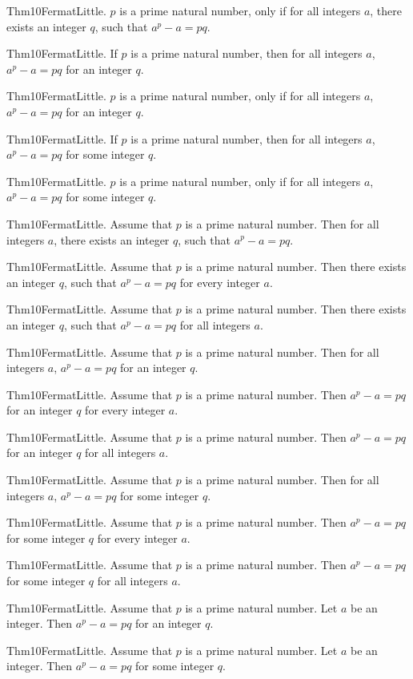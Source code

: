 \documentclass{article}
\begin{document}
Thm10FermatLittle. $p$ is a prime natural number, only if for all integers $a$, there exists an integer $q$, such that $a ^ {p}- a = p q$.

Thm10FermatLittle. If $p$ is a prime natural number, then for all integers $a$, $a ^ {p}- a = p q$ for an integer $q$.

Thm10FermatLittle. $p$ is a prime natural number, only if for all integers $a$, $a ^ {p}- a = p q$ for an integer $q$.

Thm10FermatLittle. If $p$ is a prime natural number, then for all integers $a$, $a ^ {p}- a = p q$ for some integer $q$.

Thm10FermatLittle. $p$ is a prime natural number, only if for all integers $a$, $a ^ {p}- a = p q$ for some integer $q$.

Thm10FermatLittle. Assume that $p$ is a prime natural number. Then for all integers $a$, there exists an integer $q$, such that $a ^ {p}- a = p q$.

Thm10FermatLittle. Assume that $p$ is a prime natural number. Then there exists an integer $q$, such that $a ^ {p}- a = p q$ for every integer $a$.

Thm10FermatLittle. Assume that $p$ is a prime natural number. Then there exists an integer $q$, such that $a ^ {p}- a = p q$ for all integers $a$.

Thm10FermatLittle. Assume that $p$ is a prime natural number. Then for all integers $a$, $a ^ {p}- a = p q$ for an integer $q$.

Thm10FermatLittle. Assume that $p$ is a prime natural number. Then $a ^ {p}- a = p q$ for an integer $q$ for every integer $a$.

Thm10FermatLittle. Assume that $p$ is a prime natural number. Then $a ^ {p}- a = p q$ for an integer $q$ for all integers $a$.

Thm10FermatLittle. Assume that $p$ is a prime natural number. Then for all integers $a$, $a ^ {p}- a = p q$ for some integer $q$.

Thm10FermatLittle. Assume that $p$ is a prime natural number. Then $a ^ {p}- a = p q$ for some integer $q$ for every integer $a$.

Thm10FermatLittle. Assume that $p$ is a prime natural number. Then $a ^ {p}- a = p q$ for some integer $q$ for all integers $a$.

Thm10FermatLittle. Assume that $p$ is a prime natural number. Let $a$ be an integer. Then $a ^ {p}- a = p q$ for an integer $q$.

Thm10FermatLittle. Assume that $p$ is a prime natural number. Let $a$ be an integer. Then $a ^ {p}- a = p q$ for some integer $q$.
\end{document}
